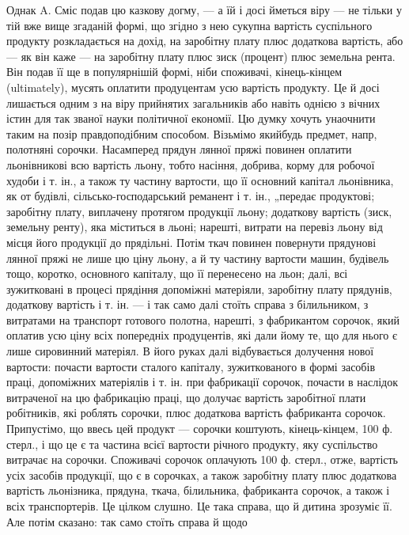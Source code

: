 Однак A. Сміс подав цю казкову догму, — а їй і досі йметься
віру — не тільки у тій вже вище згаданій формі, що згідно з нею сукупна
вартість суспільного продукту розкладається на дохід, на заробітну
плату плюс додаткова вартість, або — як він каже — на заробітну плату
плюс зиск (процент) плюс земельна рента. Він подав її ще в популярнішій
формі, ніби споживачі, кінець-кінцем (ultimately), мусять оплатити
продуцентам усю вартість продукту. Це й досі лишається
одним з на віру прийнятих загальників або навіть однією з вічних істин
для так званої науки політичної економії. Цю думку хочуть унаочнити таким
на позір правдоподібним способом. Візьмімо якийбудь предмет, напр,
полотняні сорочки. Насамперед прядун лянної пряжі повинен оплатити
льонівникові всю вартість льону, тобто насіння, добрива, корму для робочої
худоби і т. ін., а також ту частину вартости, що її основний
капітал льонівника, як от будівлі, сільсько-господарський реманент і т. ін.,
„передає продуктові; заробітну плату, виплачену протягом продукції
льону; додаткову вартість (зиск, земельну ренту), яка міститься в льоні;
нарешті, витрати на перевіз льону від місця його продукції до прядільні.
Потім ткач повинен повернути прядунові лянної пряжі не лише цю
ціну льону, а й ту частину вартости машин, будівель тощо, коротко,
основного капіталу, що її перенесено на льон; далі, всі зужитковані
в процесі прядіння допоміжні матеріяли, заробітну плату прядунів, додаткову
вартість і т. ін. — і так само далі стоїть справа з білильником, з витратами
на транспорт готового полотна, нарешті, з фабрикантом сорочок,
який оплатив усю ціну всіх попередніх продуцентів, які дали йому те,
що для нього є лише сировинний матеріял. В його руках далі відбувається
долучення нової вартости: почасти вартости сталого капіталу, зужиткованого
в формі засобів праці, допоміжних матеріялів і т. ін. при фабрикації
сорочок, почасти в наслідок витраченої на цю фабрикацію праці,
що долучає вартість заробітної плати робітників, які роблять сорочки,
плюс додаткова вартість фабриканта сорочок. Припустімо, що ввесь цей
продукт — сорочки коштують, кінець-кінцем, 100 ф. стерл., і що це є
та частина всієї вартости річного продукту, яку суспільство витрачає на
сорочки. Споживачі сорочок оплачують 100 ф. стерл., отже, вартість усіх
засобів продукції, що є в сорочках, а також заробітну плату плюс додаткова
вартість льонізника, прядуна, ткача, білильника, фабриканта сорочок,
а також і всіх транспортерів. Це цілком слушно. Це така справа, що й
дитина зрозуміє її. Але потім сказано: так само стоїть справа й щодо
